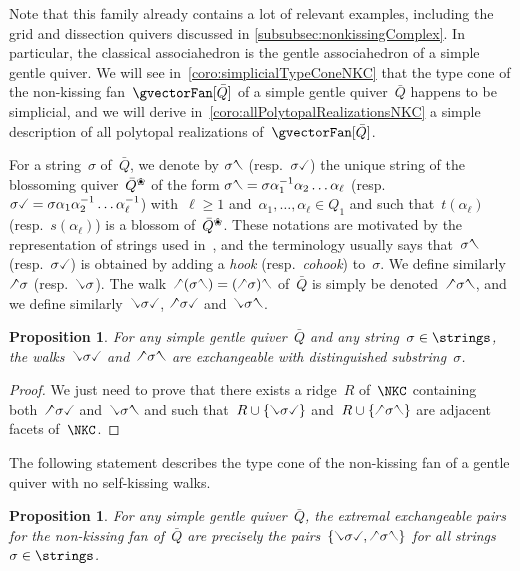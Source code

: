 \documentclass{amsart}
\newtheorem{proposition}[theorem]{Proposition}
\theoremstyle{definition}
\newcommand{\darkblue}{\color{darkblue}} %
\newcommand{\defn}[1]{\textsl{\darkblue #1}} %
\newcommand{\vincent}[1]{\todo[color=blue!30]{#1 \\ \hfill --- V.}}
\newcommand{\quiver}{\bar Q} %
\newcommand{\blossom}{^\text{\ding{96}}} %
\newcommand{\hL}{\text{\rotatebox[origin=c]{180}{\checked}}}
\newcommand{\hR}{\text{\rotatebox[origin=c]{180}{\reflectbox{\checked}}}}
\newcommand{\cL}{\text{\reflectbox{\checked}}}
\newcommand{\cR}{\text{\checked}}
\newcommand{\hh}[1]{\hL#1\hR} %
\newcommand{\cc}[1]{\cL#1\cR} %
\newcommand{\hc}[1]{\hL#1\cR} %
\newcommand{\ch}[1]{\cL#1\hR} %
\begin{document}
Note that this family already contains a lot of relevant examples, including the grid and dissection quivers discussed in \cref{subsubsec:nonkissingComplex}.
In particular, the classical associahedron is the gentle associahedron of a simple gentle quiver.
We will see in~\cref{coro:simplicialTypeConeNKC} that the type cone of the non-kissing fan~$\gvectorFan[\quiver]$ of a simple gentle quiver~$\quiver$ happens to be simplicial, and we will derive in~\cref{coro:allPolytopalRealizationsNKC} a simple description of all polytopal realizations of~$\gvectorFan[\quiver]$.

For a string~$\sigma$ of~$\quiver$, we denote by $\sigma\hR$ (resp.~$\sigma\cR$) the unique string of the blossoming quiver~$\quiver\blossom$ of the form $\sigma\hR = \sigma \alpha_1^{-1} \alpha_2 \dots \alpha_\ell$ (resp.~$\sigma\cR = \sigma \alpha_1 \alpha_2^{-1} \dots \alpha_\ell^{-1}$) with~$\ell \ge 1$ and~${\alpha_1, \dots, \alpha_\ell \in Q_1}$ and such that~$t(\alpha_\ell)$ (resp.~$s(\alpha_\ell)$) is a blossom of~$\quiver\blossom$.
These notations are motivated by the representation of strings used in~\cite{ButlerRingel, PaluPilaudPlamondon-nonkissing}, and the terminology usually says that~$\sigma\hR$ (resp.~$\sigma\cR$) is obtained by adding a \defn{hook} (resp.~\defn{cohook}) to~$\sigma$.
We define similarly~$\hL\sigma$ (resp.~$\cL\sigma$).
The walk~$\hL(\sigma\hR) = (\hL\sigma)\hR$ of~$\quiver$ is simply be denoted~$\hh{\sigma}$, and we define similarly~$\cc{\sigma}$, $\hc{\sigma}$ and~$\ch{\sigma}$.

\begin{proposition}
For any simple gentle quiver~$\quiver$ and any string~$\sigma \in \strings$, the walks~$\cc{\sigma}$ and~$\hh{\sigma}$ are exchangeable with distinguished substring~$\sigma$.
\end{proposition}

\begin{proof}
We just need to prove that there exists a ridge~$R$ of~$\NKC$ containing both~$\hc{\sigma}$ and~$\ch{\sigma}$ and such that~$R \cup \{\cc{\sigma}\}$ and~$R \cup \{\hh{\sigma}\}$ are adjacent facets of~$\NKC$.
\vincent{TODO}
\end{proof}

The following statement describes the type cone of the non-kissing fan of a gentle quiver with no self-kissing walks.

\begin{proposition}
\label{prop:extremalExchangeablePairsNKC}
For any simple gentle quiver~$\quiver$, the extremal exchangeable pairs for the non-kissing fan of~$\quiver$ are precisely the pairs~$\{\cc{\sigma}, \hh{\sigma}\}$ for all strings~$\sigma \in \strings$.
\end{proposition}
\end{document}
